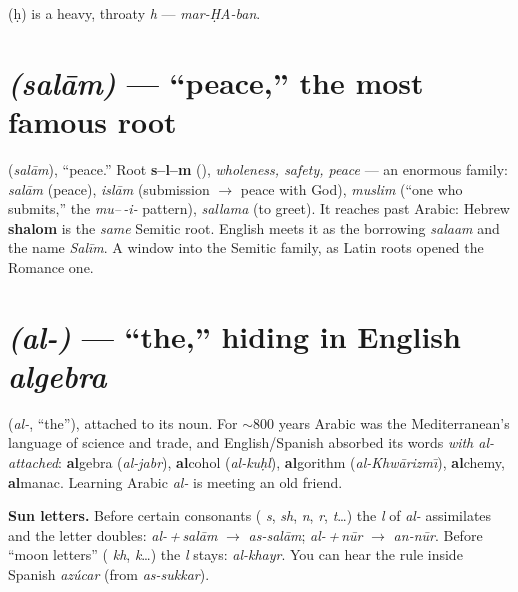 \begin{sounds}
 (\d{h}) is a heavy, throaty \emph{h} --- \emph{mar-\d{H}A-ban}.
\end{sounds}

\section{ \emph{(sal\=am)} --- ``peace,'' the most famous root}
\label{lesson:salam}

\begin{cousinweb}
 (\emph{sal\=am}), ``peace.'' Root \textbf{s--l--m} (),
\emph{wholeness, safety, peace} --- an enormous family: \emph{sal\=am} (peace),
\emph{isl\=am} (submission $\to$ peace with God), \emph{muslim} (``one who
submits,'' the \emph{mu--\,-i-} pattern), \emph{sallama} (to greet). It reaches
past Arabic: Hebrew \textbf{shalom} is the \emph{same} Semitic root. English
meets it as the borrowing \emph{salaam} and the name \emph{Sal\=im}. A window
into the Semitic family, as Latin roots opened the Romance one.
\end{cousinweb}

\section{ \emph{(al-)} --- ``the,'' hiding in English \emph{algebra}}
\label{lesson:al}

\begin{cousinweb}
 (\emph{al-}, ``the''), attached to its noun. For $\sim$800 years Arabic
was the Mediterranean's language of science and trade, and English/Spanish
absorbed its words \emph{with al- attached}: \textbf{al}gebra (\emph{al-jabr}),
\textbf{al}cohol (\emph{al-ku\d{h}l}), \textbf{al}gorithm (\emph{al-Khw\=arizm\=\i}),
\textbf{al}chemy, \textbf{al}manac. Learning Arabic \emph{al-} is meeting an
old friend.
\end{cousinweb}

\begin{grammarlens}
\textbf{Sun letters.} Before certain consonants ( \emph{s}, 
\emph{sh},  \emph{n},  \emph{r},  \emph{t}\ldots) the \emph{l}
of \emph{al-} assimilates and the letter doubles: \emph{al-\,+\,sal\=am} $\to$
\emph{as-sal\=am}; \emph{al-\,+\,n\=ur} $\to$ \emph{an-n\=ur}. Before ``moon
letters'' ( \emph{kh},  \emph{k}\ldots) the \emph{l} stays:
\emph{al-khayr}. You can hear the rule inside Spanish \emph{az\'{u}car} (from
\emph{as-sukkar}).
\end{grammarlens}

